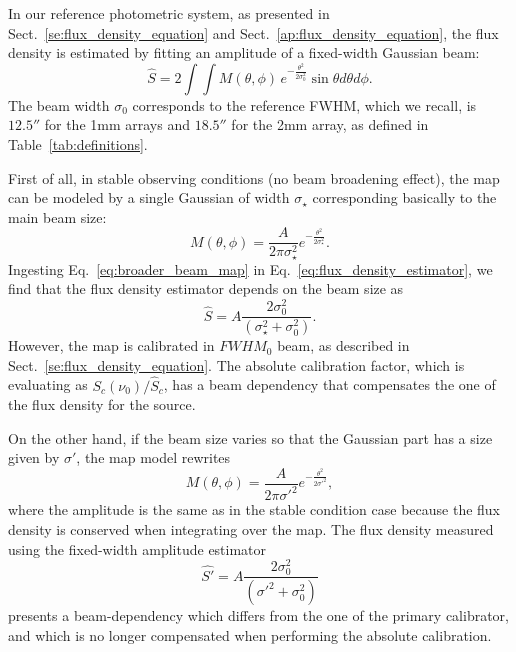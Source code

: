 In our reference photometric system, as presented in
Sect.~\ref{se:flux_density_equation} and
Sect.~\ref{ap:flux_density_equation},
the flux density is estimated by fitting an amplitude of a fixed-width
Gaussian beam:
\begin{equation}
  \hat{S}  = 2 \int \int M(\theta, \phi)\, e^{-\frac{\theta^{2}}{2\sigma_{0}^{2}}} \sin \theta d\theta d\phi.
  \label{eq:flux_density_estimator}
\end{equation}
The beam width $\sigma_{0}$ corresponds to the
reference FWHM, which we recall,  is $12.5''$ for the 1mm arrays and $18.5''$ for
the 2mm array, as defined in Table~\ref{tab:definitions}.

First of all, in stable observing conditions (no beam
broadening effect), the map can be modeled by a single Gaussian of
width $\sigma_\star$ corresponding basically to the main beam size:
\begin{equation}
  M(\theta, \phi) = \frac{A}{2 \pi \sigma_\star^{2}} e^{-\frac{\theta^{2}}{2\sigma_\star^{2}}}.
  \label{eq:pointsource_map}
\end{equation}
Ingesting Eq.~\ref{eq:broader_beam_map} in
Eq.~\ref{eq:flux_density_estimator}, we find that the flux density
estimator depends on the beam size as
\begin{equation}
  \hat{S}  = A \frac{2 \sigma_0^2}{(\sigma_{\star}^2 + \sigma_0^2)}.
\end{equation}
However, the map is calibrated in $FWHM_0$ beam, as described in
Sect.~\ref{se:flux_density_equation}. The absolute calibration factor,
which is evaluating as
$S_{c}(\nu_{0})/\hat{S}_{c}$, has a beam dependency that
compensates the one of the flux density for the source.

On the other hand, if the beam size varies so that the Gaussian part has a size given by
$\sigma'$, the map model rewrites  
\begin{equation}
  M(\theta, \phi) = \frac{A}{2 \pi \sigma'^{2}} e^{-\frac{\theta^{2}}{2\sigma'^{2}}},
  \label{eq:broader_beam_map}
\end{equation}
where the amplitude is the same as in the stable condition case
because the flux density is conserved when integrating over the map. 
The flux density measured using the fixed-width amplitude estimator 
\begin{equation}
  \hat{S'}  = A \frac{2 \sigma_0^2}{(\sigma'^2 + \sigma_0^2)}
\end{equation}
presents a beam-dependency which differs from the one of the primary
calibrator, and which is no longer compensated when performing the
absolute calibration.

